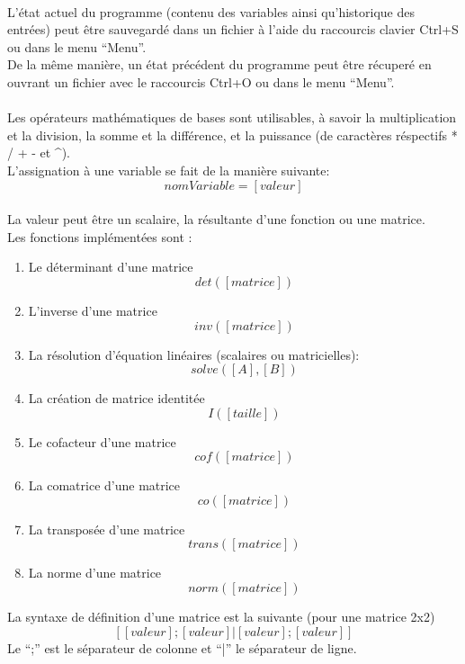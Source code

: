         \paragraph{}
            L'état actuel du programme (contenu des variables ainsi qu'historique des entrées) peut être sauvegardé dans un fichier à l'aide du raccourcis clavier Ctrl+S ou dans le menu ``Menu''.
            \\ De la même manière, un état précédent du programme peut être récuperé en ouvrant un fichier avec le raccourcis Ctrl+O ou dans le menu ``Menu''.

        \paragraph{}
            Les opérateurs mathématiques de bases sont utilisables, à savoir la multiplication et la division, la somme et la différence, et la puissance (de caractères réspectifs * / + - et ^).
            \\L'assignation à une variable se fait de la manière suivante: \[nomVariable = [valeur]\] 
            \\ La valeur peut être un scalaire, la résultante d'une fonction ou une matrice.
            \\ Les fonctions implémentées sont :
            \begin{enumerate}
                \item Le déterminant d'une matrice \[det([matrice])\]
                \item L'inverse d'une matrice \[inv([matrice])\]
                \item La résolution d'équation linéaires (scalaires ou matricielles): \[solve([A], [B])\] 
                \item La création de matrice identitée \[I([taille])\]
                \item Le cofacteur d'une matrice \[cof([matrice])\]
                \item La comatrice d'une matrice \[co([matrice])\]
                \item La transposée d'une matrice \[trans([matrice])\]
                \item La norme d'une matrice \[norm([matrice])\]
            \end{enumerate}
            La syntaxe de définition d'une matrice est la suivante (pour une matrice 2x2)
                \[ [ [valeur]; [valeur] | [valeur]; [valeur] ]\]
            Le ``;'' est le séparateur de colonne et ``|'' le séparateur de ligne.
